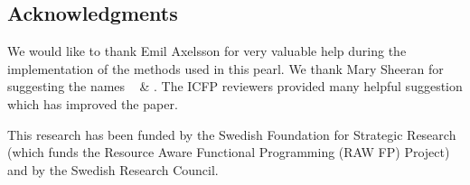 %


%
%



\subsection*{Acknowledgments} 
We would like to thank Emil Axelsson for very valuable help 
during the implementation of the methods used in this pearl. We 
thank Mary Sheeran for suggesting the names \docname~ \& \studname. 
The ICFP reviewers provided many helpful suggestion which has improved the 
paper.

This research has been funded by the Swedish Foundation for
Strategic Research (which funds the Resource Aware Functional 
Programming (RAW FP) Project) and by the Swedish Research Council.

